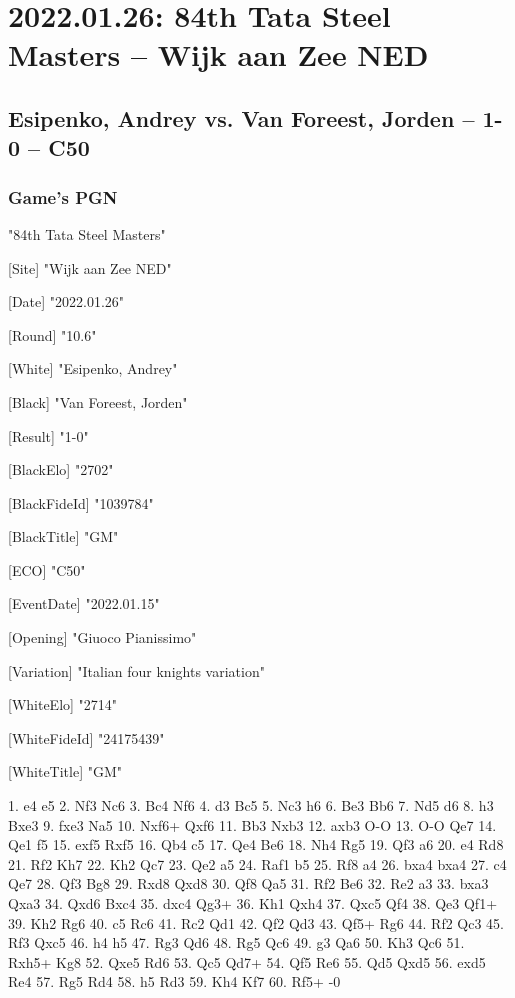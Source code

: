 \documentclass[9pt]{extarticle}
\begin{document}
\section*{2022.01.26: 84th Tata Steel Masters -- Wijk aan Zee NED}

\subsection*{Esipenko, Andrey vs. Van Foreest, Jorden -- 1-0 -- C50}
\subsubsection*{Game's PGN}
\begin{flushleft}
[Event] "84th Tata Steel Masters"

[Site] "Wijk aan Zee NED"

[Date] "2022.01.26"

[Round] "10.6"

[White] "Esipenko, Andrey"

[Black] "Van Foreest, Jorden"

[Result] "1-0"

[BlackElo] "2702"

[BlackFideId] "1039784"

[BlackTitle] "GM"

[ECO] "C50"

[EventDate] "2022.01.15"

[Opening] "Giuoco Pianissimo"

[Variation] "Italian four knights variation"

[WhiteElo] "2714"

[WhiteFideId] "24175439"

[WhiteTitle] "GM"

\end{flushleft}
\begin{flushleft}
1. e4 e5 2. Nf3 Nc6 3. Bc4 Nf6 4. d3 Bc5 5. Nc3 h6 6. Be3 Bb6 7. Nd5 d6 8. h3 Bxe3 9. fxe3 Na5 10. Nxf6+ Qxf6 11. Bb3 Nxb3 12. axb3 O-O 13. O-O Qe7 14. Qe1 f5 15. exf5 Rxf5 16. Qb4 c5 17. Qe4 Be6 18. Nh4 Rg5 19. Qf3 a6 20. e4 Rd8 21. Rf2 Kh7 22. Kh2 Qc7 23. Qe2 a5 24. Raf1 b5 25. Rf8 a4 26. bxa4 bxa4 27. c4 Qe7 28. Qf3 Bg8 29. Rxd8 Qxd8 30. Qf8 Qa5 31. Rf2 Be6 32. Re2 a3 33. bxa3 Qxa3 34. Qxd6 Bxc4 35. dxc4 Qg3+ 36. Kh1 Qxh4 37. Qxc5 Qf4 38. Qe3 Qf1+ 39. Kh2 Rg6 40. c5 Rc6 41. Rc2 Qd1 42. Qf2 Qd3 43. Qf5+ Rg6 44. Rf2 Qc3 45. Rf3 Qxc5 46. h4 h5 47. Rg3 Qd6 48. Rg5 Qc6 49. g3 Qa6 50. Kh3 Qc6 51. Rxh5+ Kg8 52. Qxe5 Rd6 53. Qc5 Qd7+ 54. Qf5 Re6 55. Qd5 Qxd5 56. exd5 Re4 57. Rg5 Rd4 58. h5 Rd3 59. Kh4 Kf7 60. Rf5+ \quad  {}-0
\end{flushleft}
\end{document}

